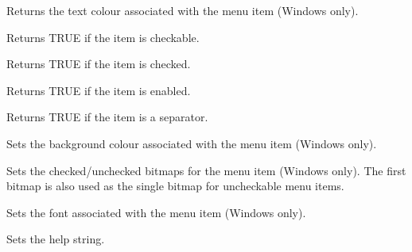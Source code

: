 Returns the text colour associated with the menu item (Windows only).

\label{wxmenuitemischeckable}


Returns TRUE if the item is checkable.

\label{wxmenuitemischecked}


Returns TRUE if the item is checked.

\label{wxmenuitemisenabled}


Returns TRUE if the item is enabled.

\label{wxmenuitemisseparator}


Returns TRUE if the item is a separator.

\label{wxmenuitemsetbackgroundcolour}


Sets the background colour associated with the menu item (Windows only).

\label{wxmenuitemsetbitmaps}


Sets the checked/unchecked bitmaps for the menu item (Windows only). The first bitmap
is also used as the single bitmap for uncheckable menu items.

\label{wxmenuitemsetfont}


Sets the font associated with the menu item (Windows only).

\label{wxmenuitemsethelp}


Sets the help string.

\label{wxmenuitemsetmarginwidth}

